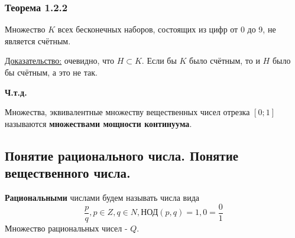 \documentclass[12pt]{article}
\begin{document}
    \subsubsection*{Теорема 1.2.2}\label{th:1.2.2}
    Множество $K$ всех бесконечных наборов, состоящих из цифр от 0 до 9, не является счётным.\par\noindent
    \underline{Доказательство:} очевидно, что $H \subset K$. Если бы $K$ было счётным, то и $H$ было бы счётным, а это не так.
    \begin{center}
        \textbf{Ч.т.д.}
    \end{center}
    Множества, эквивалентные множеству вещественных чисел отрезка $[0;1]$ называются \textbf{множествами мощности континуума}.

    \subsection{Понятие рационального числа. Понятие вещественного числа.}
    \noindent \textbf{Рациональными} числами будем называть числа вида \[\frac{p}{q}, p \in Z, q \in N, \text{НОД}(p,q) = 1, 0 = \frac{0}{1}\]
    Множество рациональных чисел - $Q$.
\end{document}
